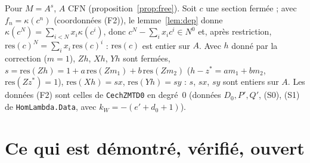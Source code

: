 \documentclass[11pt]{amsart}
\theoremstyle{definition}
\theoremstyle{remark}
\begin{document}
Pour $M=A^s$, $A$ CFN (proposition~\ref{prop:free}). Soit $c$ une section
fermée ; avec $f_n=\kappa(c^n)$ (coordonnées (F2)), le
lemme~\ref{lem:dep} donne $\kappa(c^N)=\sum_{i<N}x_i\kappa(c^i)$, donc
$c^N-\sum_ix_ic^i\in N^0$ et, après restriction,
$\mathrm{res}(c)^N=\sum_ix_i\,\mathrm{res}(c)^i$ : $\mathrm{res}(c)$ est
entier sur $A$. Avec $h$ donné par la correction ($m=1$), $Zh$, $Xh$, $Yh$
sont fermées, $s=\mathrm{res}(Zh)=1+a\,\mathrm{res}(Zm_1)+b\,\mathrm{res}(Zm_2)$
($h-z^*=am_1+bm_2$, $\mathrm{res}(Zz^*)=1$), $\mathrm{res}(Xh)=sx$,
$\mathrm{res}(Yh)=sy$ : $s$, $sx$, $sy$ sont entiers sur $A$. Les données
(F2) sont celles de \texttt{CechZMTD0} en degré~$0$ (données
$D_0,P',Q'$, (S0), (S1) de \texttt{HomLambda.Data}, avec
$k_W=-(e'+d_0+1)$).

\section{Ce qui est démontré, vérifié, ouvert}
\end{document}
